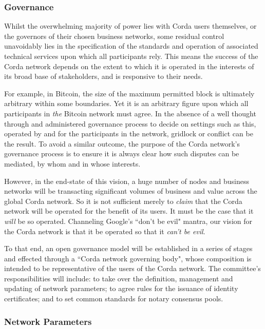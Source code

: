 \documentclass{article}
\begin{document}
\subsubsection{Governance}

Whilst the overwhelming majority of power lies with Corda users themselves, or the governors of their chosen business networks, some residual control unavoidably lies in the specification of the standards and operation of associated technical services upon which all participants rely. This means the success of the Corda network depends on the extent to which it is operated in the interests of its broad base of stakeholders, and is responsive to their needs.

For example, in Bitcoin, the size of the maximum permitted block is ultimately arbitrary within some boundaries. Yet it is an arbitrary figure upon which all participants in \textit{the} Bitcoin network must agree. In the absence of a well thought through and administered governance process to decide on settings such as this, operated by and for the participants in the network, gridlock or conflict can be the result. To avoid a similar outcome, the purpose of the Corda network's governance process is to ensure it is always clear how such disputes can be mediated, by whom and in whose interests.

However, in the end-state of this vision, a huge number of nodes and business networks will be transacting significant volumes of business and value across the global Corda network. So it is not sufficient merely to \textit{claim} that the Corda network will be operated for the benefit of its users. It must be the case that it \textit{will} be so operated. Channeling Google's ``don't be evil" mantra, our vision for the Corda network is that it be operated so that it \textit{can't be evil}.

To that end, an open governance model will be established in a series of stages and effected through a ``Corda network governing body", whose composition is intended to be representative of the users of the Corda network. The committee's responsibilities will include: to take over the definition, management and updating of network parameters; to agree rules for the issuance of identity certificates; and to set common standards for notary consensus pools.

\subsubsection{Network Parameters}
\end{document}
